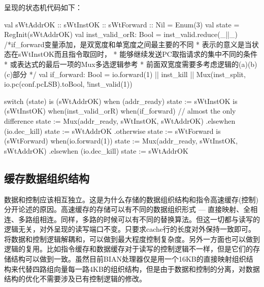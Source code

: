 呈现的状态机代码如下：
\begin{scala}
	val sWtAddrOK :: sWtInstOK :: sWtForward :: Nil = Enum(3)
	val state = RegInit(sWtAddrOK)
	val inst_valid_orR: Bool = inst_valid.reduce(_||_)
	/*if_forward变量添加，是双宽度和单宽度之间最主要的不同
	* 表示的意义是当状态在sWtInstOK而且指令取回时，
	* 能够继续发送PC取指请求的集中不同的条件
	* 或表达式的最后一项的Mux多选逻辑参考
	* 前面双宽度需要多考虑逻辑的(a)(b)(c)部分
	*/
	val if_forward: Bool = io.forward(1) || inst_kill || Mux(inst_split, io.pc(conf.pcLSB).toBool, !inst_valid(1))

	switch (state) {
		is (sWtAddrOK) {
			when (addr_ready) { state := sWtInstOK }
		}
		is (sWtInstOK) {
			when(inst_valid_orR) {
				when(if_forward) { // almost the only difference
					state := Mux(addr_ready, sWtInstOK, sWtAddrOK)
				}.elsewhen (io.dec_kill) { state := sWtAddrOK
				}.otherwise { state := sWtForward }
			}
		}
		is (sWtForward) {
			when(io.forward(1)) {
				state := Mux(addr_ready, sWtInstOK, sWtAddrOK)
			}.elsewhen (io.dec_kill) { state := sWtAddrOK }
		}
	}
\end{scala}

\subsection{缓存数据组织结构}\label{subsec:cache_core}
数据和控制应该相互独立。这是为什么存储的数据组织结构和指令高速缓存(控制)分开论述的原因。高速缓存的存储可以有不同的数据组织形式 --- 直接映射、全相连、多路组相连。同样，多路的时候可以有不同的替换算法。但这一切都与读写的逻辑无关，对外呈现的读写端口不变。只要求cache行的长度对外保持一致即可。将数据和控制逻辑解耦和，可以做到最大程度控制复杂度。另外一方面也可以做到逻辑的复用。比如指令缓存和数据缓存对于读写的控制逻辑不一样，但是它们的存储结构可以做到一致。虽然目前BIAN处理器仅是用一个16KB的直接映射组织结构来代替四路组向量每一路4KB的组织结构，但是由于数据和控制的分离，对数据结构的优化不需要涉及已有控制逻辑的修改。

